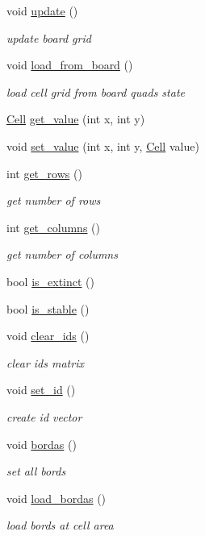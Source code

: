 \begin{DoxyCompactItemize}
void \hyperlink{classLife_a0e00f2735584f3ddebb397742b520d3b}{update} ()
\begin{DoxyCompactList}\small\item\em update board grid \end{DoxyCompactList}\item 
void \hyperlink{classLife_a17e8f25c5f814ee868ef3f943c9dddcd}{load\+\_\+from\+\_\+board} ()
\begin{DoxyCompactList}\small\item\em load cell grid from board quads state \end{DoxyCompactList}\item 
\hyperlink{life_8h_a0133c02dfc35ffbaf07ad1a587dac4d1}{Cell} \hyperlink{classLife_a3beeb3680b687283d2db135650e690bf}{get\+\_\+value} (int x, int y)
\item 
void \hyperlink{classLife_a5f6a86de4c6db6d1b70b507cee58a54f}{set\+\_\+value} (int x, int y, \hyperlink{life_8h_a0133c02dfc35ffbaf07ad1a587dac4d1}{Cell} value)
\item 
int \hyperlink{classLife_ae4a3608385b8435f55102c89363d6e26}{get\+\_\+rows} ()
\begin{DoxyCompactList}\small\item\em get number of rows \end{DoxyCompactList}\item 
int \hyperlink{classLife_ac82f1ba83db36b3142ec12c2fc334de3}{get\+\_\+columns} ()
\begin{DoxyCompactList}\small\item\em get number of columns \end{DoxyCompactList}\item 
bool \hyperlink{classLife_a7b7cd244c2ce5b7d6ed0db9a188b2256}{is\+\_\+extinct} ()
\item 
bool \hyperlink{classLife_a773454947fcc1f7c576c8749647d9ba2}{is\+\_\+stable} ()
\item 
void \hyperlink{classLife_ac79ef6f9e91fd76fc9d1906cfc2b34ee}{clear\+\_\+ids} ()
\begin{DoxyCompactList}\small\item\em clear ids matrix \end{DoxyCompactList}\item 
void \hyperlink{classLife_a085768fbd7a228f0e4323208dbe99a0a}{set\+\_\+id} ()
\begin{DoxyCompactList}\small\item\em create id vector \end{DoxyCompactList}\item 
void \hyperlink{classLife_a80aac6b6b00f8cf0589207953f3f844b}{bordas} ()
\begin{DoxyCompactList}\small\item\em set all bords \end{DoxyCompactList}\item 
void \hyperlink{classLife_a8cc497d4d07aa0d9b6b31faa14f0e12f}{load\+\_\+bordas} ()
\begin{DoxyCompactList}\small\item\em load bords at cell area \end{DoxyCompactList}\end{DoxyCompactItemize}
